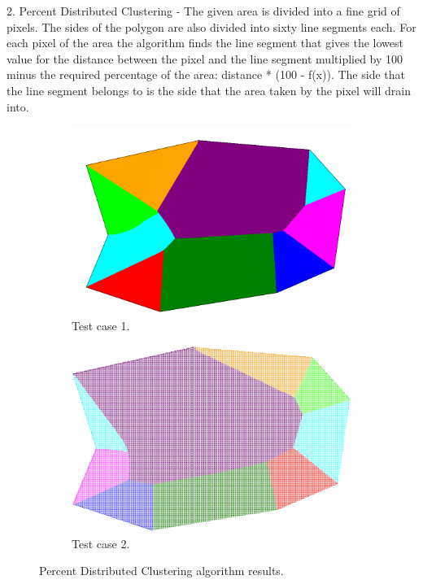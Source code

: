 \documentclass{article}
\begin{document}
2. Percent Distributed Clustering - The given area is divided into a fine grid of pixels. The sides of the polygon are also divided into sixty line segments each. For each pixel of the area the algorithm finds the line segment that gives the lowest value for the distance between the pixel and the line segment multiplied by 100 minus the required percentage of the area: distance * (100 - f(x)). The side that the line segment belongs to is the side that the area taken by the pixel will drain into.
\begin{figure}[h!]
\centering
\begin{subfigure}{.5\textwidth}
  \centering
  \includegraphics[width=.5\linewidth]{pic10.png}
  \caption{Test case 1.}
  \label{fig:sub9}
\end{subfigure}%
\begin{subfigure}{.5\textwidth}
  \centering
  \includegraphics[width=.5\linewidth]{pic11.png}
  \caption{Test case 2.}
  \label{fig:sub10}
\end{subfigure}
\caption{Percent Distributed Clustering algorithm results.}
\label{fig:six}
\end{figure}
\end{document}
